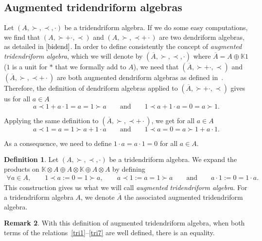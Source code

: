 \documentclass[10pt,a4paper]{amsart}
\numberwithin{equation}{section}
\theoremstyle{definition}
\newtheorem{defi}{Definition}[section]
\newtheorem{Rq}[defi]{Remark}
\theoremstyle{plain}
\newcommand{\K}{\mathbb{K}}
\begin{document}
\subsection{Augmented tridendriform algebras }\label{sec:Aug}
Let $(A,\succ, \prec, \cdot)$ be a tridendriform algebra. If we do some easy computations, we find that $(A,\succ +\cdot, \prec)$ and $(A,\succ, \prec +\cdot)$ are two dendriform algebras, as detailed in $\cite{bidend}$.
In order to define consistently the concept of \emph{augmented tridendriform algebra}, which we will denote by $(\overline{A},\succ,\prec,\cdot)$ where $\overline{A}=A\oplus \K1$ ($1$ is a unit for $*$ that we formally add to $A$), we need that $(\overline{A},\succ +\cdot, \prec)$ and $(\overline{A},\succ, \prec +\cdot)$ are both augmented dendriform algebras as defined in~\cite[Section~3.1]{Augm}.
Therefore, the definition of dendriform algebras applied to $(\overline{A},\succ +\cdot, \prec)$ gives us for all $a\in A$
\begin{equation*}
	a\prec 1+ a\cdot 1=a=1\succ a \qquad \text{and} \qquad 1\prec a + 1 \cdot a=0=a\succ 1.
\end{equation*}

Applying the same definition to $(\overline{A},\succ, \prec+\cdot)$, we get for all $a\in A$
\begin{equation*}
a\prec 1 =a=1\succ a+1\cdot a \qquad \text{and} \qquad 1\prec a =0=a\succ 1+a\cdot 1.
\end{equation*}

As a consequence, we need to define $1\cdot a=a\cdot 1=0$ for all $a\in A$.

\begin{defi}
	Let $(A,\succ,\prec,\cdot)$ be a tridendriform algebra. We expand the products on \linebreak$\K\otimes A\oplus A\otimes \K \oplus A\otimes A$ by defining
	\begin{gather}\label{def:augment}
		\forall a\in A, \!\qquad 1\prec a :=0=1\succ a, \!\qquad a\prec 1:=a=1\succ a \!\qquad \text{and} \!\qquad a\cdot 1:=0=1\cdot a.
	\end{gather}
	This construction gives us what we will call \emph{augmented tridendriform algebra}. For a tridendriform algebra $A$, we denote $\overline{A}$ the associated augmented tridendriform algebra.
\end{defi}

\begin{Rq}\label{Rq:relations+}
	With this definition of augmented tridendriform algebra, when both terms of the relations~\eqref{tri1}--\eqref{tri7} are well defined, there is an equality.
\end{Rq}
\end{document}
